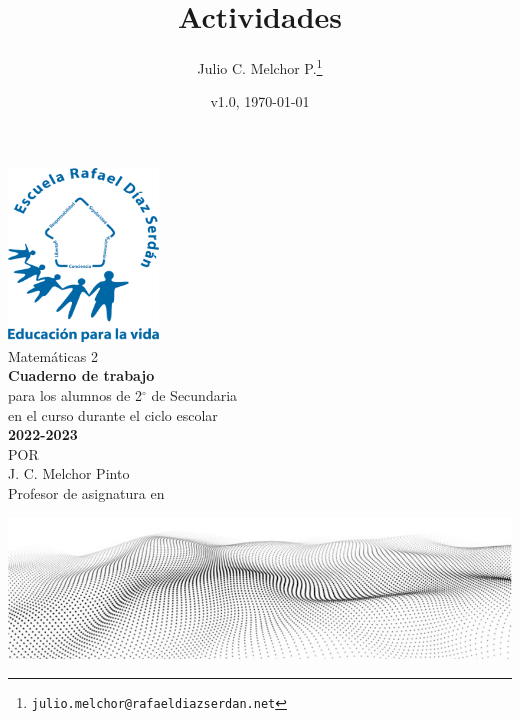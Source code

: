\documentclass{book}
\title{Actividades}
\author{Julio C. Melchor P.\thanks{{\tt julio.melchor@rafaeldiazserdan.net}}}
\date{v1.0, \today}
\begin{document}
\begin{center}
    \vspace{4cm}
    \includegraphics[width=4cm]{./Images/LOGO_RDS_nobg}\\
    \vspace{2cm}
    {\Huge Matem\'aticas 2}\\
    \vspace{2cm}
    \normalsize
    \textbf{\large Cuaderno de trabajo}\\
    para los alumnos de 2$^\circ$ de  Secundaria\\
    en el curso durante el ciclo escolar\\
    \textbf{2022-2023}\\
    \vspace{2.8cm}
    \small POR\\
    \Large J. C. Melchor Pinto\\[0.5em]
    \normalsize Profesor de asignatura en\\
\end{center}
\vspace{2.5cm}
%
\hspace{-16mm}
\includegraphics[width=\paperwidth]{./Images/cover_bg}
\end{document}
